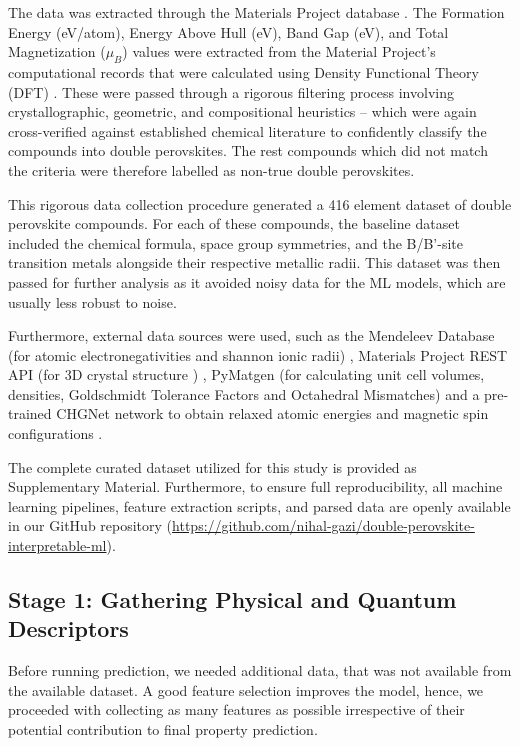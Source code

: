 \documentclass[12pt,onecolumn]{elsarticle}
\begin{document}
The data was extracted through the Materials Project database \cite{materialsproject}. The Formation Energy (eV/atom), Energy Above Hull (eV), Band Gap (eV), and Total Magnetization ($\mu_B$) values were extracted from the Material Project’s computational records that were calculated using Density Functional Theory (DFT) \cite{materialsproject}. These were passed through a rigorous filtering process involving crystallographic, geometric, and compositional heuristics – which were again cross-verified against established chemical literature \cite{goldschmidt, shannon} to confidently classify the compounds into double perovskites. The rest compounds which did not match the criteria were therefore labelled as non-true double perovskites.

This rigorous data collection procedure generated a 416 element dataset of double perovskite compounds. For each of these compounds, the baseline dataset included the chemical formula, space group symmetries, and the B/B'-site transition metals alongside their respective metallic radii. This dataset was then passed for further analysis as it avoided noisy data for the ML models, which are usually less robust to noise.

Furthermore, external data sources were used, such as the Mendeleev Database (for atomic electronegativities and shannon ionic radii) \cite{goldschmidt, shannon}, Materials Project REST API (for 3D crystal structure ) \cite{materialsproject}, PyMatgen (for calculating unit cell volumes, densities, Goldschmidt Tolerance Factors and Octahedral Mismatches) and a pre-trained CHGNet network to obtain relaxed atomic energies and magnetic spin configurations \cite{chgnet}.

The complete curated dataset utilized for this study is provided as Supplementary Material. Furthermore, to ensure full reproducibility, all machine learning pipelines, feature extraction scripts, and parsed data are openly available in our GitHub repository (\url{https://github.com/nihal-gazi/double-perovskite-interpretable-ml}).




\subsection{Stage 1: Gathering Physical and Quantum Descriptors}
Before running prediction, we needed additional data, that was not available from the available dataset. A good feature selection improves the model, hence, we proceeded with collecting as many features as possible irrespective of their potential contribution to final property prediction.
\end{document}
